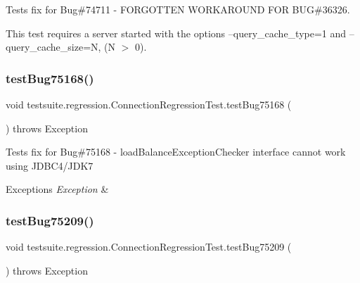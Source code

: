 Tests fix for Bug\#74711 -\/ F\+O\+R\+G\+O\+T\+T\+EN W\+O\+R\+K\+A\+R\+O\+U\+ND F\+OR B\+UG\#36326.

This test requires a server started with the options \textquotesingle{}--query\+\_\+cache\+\_\+type=1\textquotesingle{} and \textquotesingle{}--query\+\_\+cache\+\_\+size=N\textquotesingle{}, (N $>$ 0). \mbox{\label{classtestsuite_1_1regression_1_1_connection_regression_test_a481102d0bf994ee0a48b67f1a1328c43}} 
\subsubsection{\texorpdfstring{test\+Bug75168()}{testBug75168()}}
{\footnotesize\ttfamily void testsuite.\+regression.\+Connection\+Regression\+Test.\+test\+Bug75168 (\begin{DoxyParamCaption}{ }\end{DoxyParamCaption}) throws Exception}

Tests fix for Bug\#75168 -\/ load\+Balance\+Exception\+Checker interface cannot work using J\+D\+B\+C4/\+J\+D\+K7


\begin{DoxyExceptions}{Exceptions}
{\em Exception} & \\
\hline
\end{DoxyExceptions}
\mbox{\label{classtestsuite_1_1regression_1_1_connection_regression_test_a0cc242ab6f5c5f0c1bb19d14d37bb866}} 
\subsubsection{\texorpdfstring{test\+Bug75209()}{testBug75209()}}
{\footnotesize\ttfamily void testsuite.\+regression.\+Connection\+Regression\+Test.\+test\+Bug75209 (\begin{DoxyParamCaption}{ }\end{DoxyParamCaption}) throws Exception}


